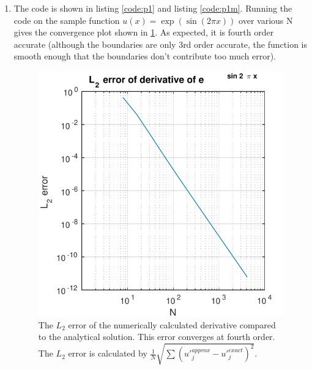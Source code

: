 \documentclass{article}
\begin{document}
\begin{enumerate}
\item
The code is shown in listing \ref{code:p1} and listing \ref{code:p1m}.
Running the code on the sample function $u(x) = \exp(\sin (2 \pi x))$ over various N gives the convergence plot shown in \ref{fig:p1}.
As expected, it is fourth order accurate (although the boundaries are only 3rd order accurate, the function is smooth enough that the boundaries don't contribute too much error).
\begin{figure}[!ht]
\centering
\includegraphics[scale=1]{p1err.pdf}
\caption{The $L_2$ error of the numerically calculated derivative compared to the analytical solution. This error converges at fourth order. The $L_2$ error is calculated by $\frac{1}{N} \sqrt{ \sum{(u'^{approx}_j - u'^{exact}_j)^2}}$.}
\label{fig:p1}
\end{figure}
\end{enumerate}
\end{document}
